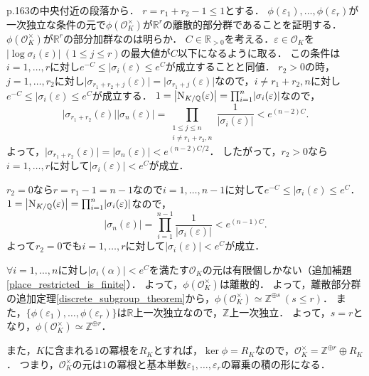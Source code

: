 p.163の中央付近の段落から．
$r=r_1+r_2-1\leq1$とする．
$\phi(\varepsilon_1),\ldots,\phi(\varepsilon_r)$が一次独立な条件の元で$\phi(\mathcal{O}_K^\times)$が$\mathbb{R}^r$の離散的部分群であることを証明する．
$\phi(\mathcal{O}_K^\times)$が$\mathbb{R}^r$の部分加群なのは明らか．
$C\in\mathbb{R}_{>0}$を考える．$\varepsilon\in\mathcal{O}_K$を$\lvert\log\sigma_i(\varepsilon)\rvert\ (1\leq j\leq r)$の最大値が$C$以下になるように取る．
この条件は$i=1,\ldots,r$に対し$e^{-C}\leq\lvert\sigma_i(\varepsilon)\leq e^C$が成立することと同値．
$r_2>0$の時，$j=1,\ldots,r_2$に対し$\lvert\sigma_{r_1+r_2+j}(\varepsilon)\rvert=\lvert\sigma_{r_1+j}(\varepsilon)\rvert$なので，$i\neq r_1+r_2,n$に対し$e^{-C}\leq\lvert\sigma_i(\varepsilon)\leq e^C$が成立する．
$1=\left\lvert\operatorname{N}_{K/\mathbb{Q}}(\varepsilon)\right\rvert=\prod_{i=1}^n\lvert\sigma_i(\varepsilon)\rvert$なので，
\[\lvert\sigma_{r_1+r_2}(\varepsilon)\rvert\lvert\sigma_n(\varepsilon)\rvert=\prod_{\substack{1\leq j\leq n\\ i\neq r_1+r_2,n}}\frac{1}{\lvert\sigma_i(\varepsilon)\rvert}< e^{(n-2)C}.\]
よって，$\lvert\sigma_{r_1+r_2}(\varepsilon)\rvert=\lvert\sigma_n(\varepsilon)\rvert< e^{(n-2)C/2}$．
したがって，$r_2>0$なら$i=1,\ldots,r$に対して$\lvert\sigma_i(\varepsilon)\rvert< e^{C}$が成立．

$r_2=0$なら$r=r_1-1=n-1$なので$i=1,\ldots,n-1$に対して$e^{-C}\leq\lvert\sigma_i(\varepsilon)\leq e^C$．
$1=\left\lvert\operatorname{N}_{K/\mathbb{Q}}(\varepsilon)\right\rvert=\prod_{i=1}^n\lvert\sigma_i(\varepsilon)\rvert$なので，
\[\lvert\sigma_n(\varepsilon)\rvert=\prod_{i=1}^{n-1}\frac{1}{\lvert\sigma_i(\varepsilon)\rvert}< e^{(n-1)C}.\]
よって$r_2=0$でも$i=1,\ldots,r$に対して$\lvert\sigma_i(\varepsilon)\rvert< e^{C}$が成立．

$\forall i=1,\ldots,n$に対し$\lvert\sigma_i(\alpha)\rvert< e^C$を満たす$\mathcal{O}_K$の元は有限個しかない（追加補題\ref{place_restricted_is_finite}）．
よって，$\phi(\mathcal{O}_K^\times)$は離散的．
よって，離散部分群の追加定理\ref{discrete_subgroup_theorem}から，$\phi(\mathcal{O}_K^\times)\simeq\mathbb{Z}^{\oplus s}\ (s\leq r)$．
また，$\{\phi(\varepsilon_1),\ldots,\phi(\varepsilon_r)\}$は$\mathbb{R}$上一次独立なので，$\mathbb{Z}$上一次独立．
よって，$s=r$となり，$\phi(\mathcal{O}_K^\times)\simeq\mathbb{Z}^{\oplus r}$．

また，$K$に含まれる$1$の冪根を$R_K$とすれば，$\ker\phi=R_K$なので，$\mathcal{O}_K^\times=\mathbb{Z}^{\oplus r}\oplus R_K$．
つまり，$\mathcal{O}_K^\times$の元は$1$の冪根と基本単数$\varepsilon_1,\ldots,\varepsilon_r$の冪乗の積の形になる．

